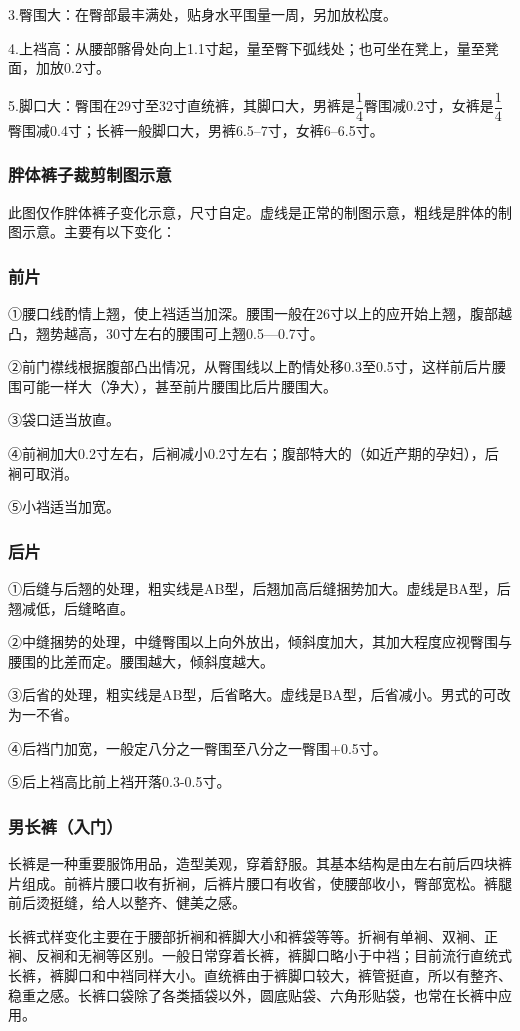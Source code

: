 \documentclass{ctexbook}
\begin{document}
3.臀围大：在臀部最丰满处，贴身水平围量一周，另加放松度。

4.上裆高：从腰部髂骨处向上1.1寸起，量至臀下弧线处；也可坐在凳上，量至凳面，加放0.2寸。

5.脚口大：臀围在29寸至32寸直统裤，其脚口大，男裤是$\dfrac{1}{4}$臀围减0.2寸，女裤是$\dfrac{1}{4}$臀围减0.4寸；长裤一般脚口大，男裤6.5--7寸，女裤6--6.5寸。
\subsubsection{胖体裤子裁剪制图示意}
此图仅作胖体裤子变化示意，尺寸自定。虚线是正常的制图示意，粗线是胖体的制图示意。主要有以下变化：
\subsubsection{前片}
①腰口线酌情上翘，使上裆适当加深。腰围一般在26寸以上的应开始上翘，腹部越凸，翘势越高，30寸左右的腰围可上翘0.5—0.7寸。

②前门襟线根据腹部凸出情况，从臀围线以上酌情处移0.3至0.5寸，这样前后片腰围可能一样大（净大），甚至前片腰围比后片腰围大。

③袋口适当放直。

④前裥加大0.2寸左右，后裥减小0.2寸左右；腹部特大的（如近产期的孕妇），后裥可取消。

⑤小裆适当加宽。
\subsubsection{后片}
①后缝与后翘的处理，粗实线是AB型，后翘加高后缝捆势加大。虚线是BA型，后翘减低，后缝略直。

②中缝捆势的处理，中缝臀围以上向外放出，倾斜度加大，其加大程度应视臀围与腰围的比差而定。腰围越大，倾斜度越大。

③后省的处理，粗实线是AB型，后省略大。虚线是BA型，后省减小。男式的可改为一不省。

④后裆门加宽，一般定八分之一臀围至八分之一臀围+0.5寸。

⑤后上裆高比前上裆开落0.3-0.5寸。
\subsubsection{男长裤（入门）}
长裤是一种重要服饰用品，造型美观，穿着舒服。其基本结构是由左右前后四块裤片组成。前裤片腰口收有折裥，后裤片腰口有收省，使腰部收小，臀部宽松。裤腿前后烫挺缝，给人以整齐、健美之感。

长裤式样变化主要在于腰部折裥和裤脚大小和裤袋等等。折裥有单裥、双裥、正裥、反裥和无裥等区别。一般日常穿着长裤，裤脚口略小于中裆；目前流行直统式长裤，裤脚口和中裆同样大小。直统裤由于裤脚口较大，裤管挺直，所以有整齐、稳重之感。长裤口袋除了各类插袋以外，圆底贴袋、六角形贴袋，也常在长裤中应用。
\end{document}
